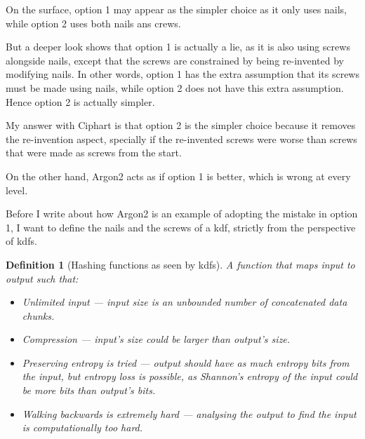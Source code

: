\documentclass[twocolumn]{article}
\newtheorem{definition}{Definition}[section]
\begin{document}
On the surface, option 1 may appear as the simpler choice as it only uses
nails, while option 2 uses both nails ans crews.

But a deeper look shows that option 1 is actually a lie, as it is also
using screws alongside nails, except that the screws are constrained by
being re-invented by modifying nails.  In other words, option 1 has the
extra assumption that its screws must be made using nails, while option 2
does not have this extra assumption.  Hence option 2 is actually simpler.

My answer with Ciphart is that option 2 is the simpler choice
because it removes the re-invention aspect, specially if the re-invented
screws were worse than screws that were made as screws from the start.

On the other hand, Argon2 acts as if option 1 is better, which is
wrong at every level.

Before I write about how Argon2 is an example of adopting the
mistake in option 1, I want to define the nails and the screws of a
\gls{kdf}, strictly from the perspective of \glspl{kdf}.

\begin{definition}[Hashing functions as seen by
\glspl{kdf}]\label{def_kdf_hash}
    A function that maps input to output such that:
    \begin{itemize}
        \item Unlimited input --- input size is an unbounded number of
        concatenated data chunks.

        \item Compression --- input's size could be larger than output's
        size.

        \item Preserving entropy is tried --- output should have as much
        entropy bits from the input, but entropy loss is possible, as
        Shannon's entropy of the input could be more bits than output's
        bits.

        \item Walking backwards is extremely hard --- analysing the output
        to find the input is computationally too hard.
    \end{itemize}
\end{definition}
\end{document}
